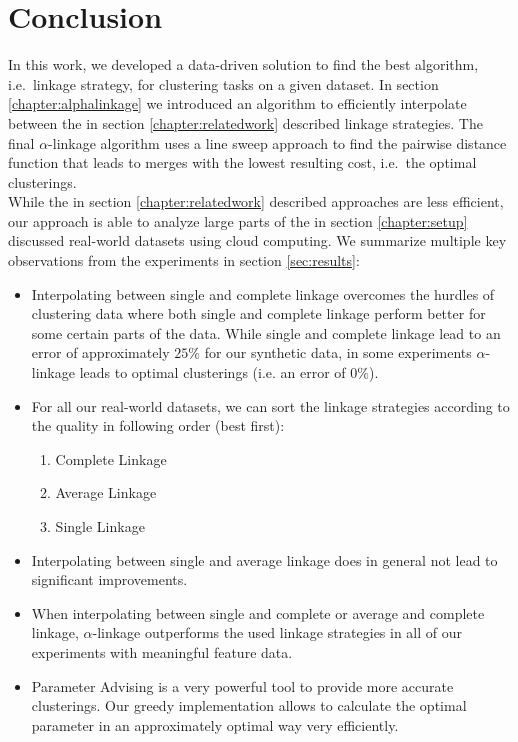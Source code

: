 \chapter{Conclusion}

In this work, we developed a data-driven solution to find the best algorithm, i.e.\ linkage strategy, for clustering tasks on a given dataset. In section \ref{chapter:alphalinkage} we introduced an algorithm to efficiently interpolate between the in section \ref{chapter:relatedwork} described linkage strategies. The final $\alpha$-linkage algorithm uses a line sweep approach to find the pairwise distance function that leads to merges with the lowest resulting cost, i.e.\ the optimal clusterings.\\

While the in section \ref{chapter:relatedwork} described approaches are less efficient, our approach is able to analyze large parts of the in section \ref{chapter:setup}  discussed real-world datasets using cloud computing. We summarize multiple key observations from the experiments in section \ref{sec:results}:
\begin{itemize}
\item Interpolating between single and complete linkage overcomes the hurdles of clustering data where both single and complete linkage perform better for some certain parts of the data. While single and complete linkage lead to an error of approximately $25\%$ for our synthetic data, in some experiments $\alpha$-linkage leads to optimal clusterings (i.e. an error of $0\%$).
\item For all our real-world datasets, we can sort the linkage strategies according to the quality in following order (best first):
\begin{enumerate}
\item Complete Linkage
\item Average Linkage
\item Single Linkage
\end{enumerate}
\item Interpolating between single and average linkage does in general not lead to significant improvements.
\item When interpolating between single and complete or average and complete linkage, $\alpha$-linkage outperforms the used linkage strategies in all of our experiments with meaningful feature data.
\item Parameter Advising is a very powerful tool to provide more accurate clusterings. Our greedy implementation allows to calculate the optimal parameter in an approximately optimal way very efficiently.
\end{itemize}

